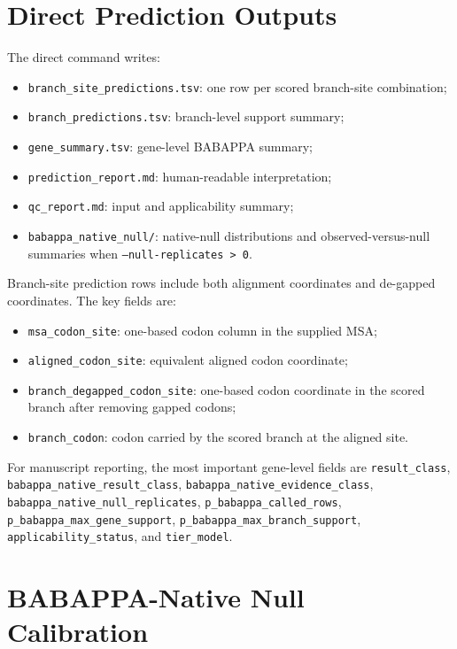 \documentclass[11pt,a4paper]{article}
\begin{document}
\section{Direct Prediction Outputs}

The direct command writes:

\begin{itemize}[leftmargin=*]
  \item \texttt{branch\_site\_predictions.tsv}: one row per scored branch-site combination;
  \item \texttt{branch\_predictions.tsv}: branch-level support summary;
  \item \texttt{gene\_summary.tsv}: gene-level BABAPPA summary;
  \item \texttt{prediction\_report.md}: human-readable interpretation;
  \item \texttt{qc\_report.md}: input and applicability summary;
  \item \texttt{babappa\_native\_null/}: native-null distributions and observed-versus-null summaries when \texttt{--null-replicates > 0}.
\end{itemize}

Branch-site prediction rows include both alignment coordinates and de-gapped coordinates. The key fields are:

\begin{itemize}[leftmargin=*]
  \item \texttt{msa\_codon\_site}: one-based codon column in the supplied MSA;
  \item \texttt{aligned\_codon\_site}: equivalent aligned codon coordinate;
  \item \texttt{branch\_degapped\_codon\_site}: one-based codon coordinate in the scored branch after removing gapped codons;
  \item \texttt{branch\_codon}: codon carried by the scored branch at the aligned site.
\end{itemize}

For manuscript reporting, the most important gene-level fields are \texttt{result\_class}, \texttt{babappa\_native\_result\_class}, \texttt{babappa\_native\_evidence\_class}, \texttt{babappa\_native\_null\_replicates}, \texttt{p\_babappa\_called\_rows}, \texttt{p\_babappa\_max\_gene\_support}, \texttt{p\_babappa\_max\_branch\_support}, \texttt{applicability\_status}, and \texttt{tier\_model}.

\section{BABAPPA-Native Null Calibration}
\end{document}
